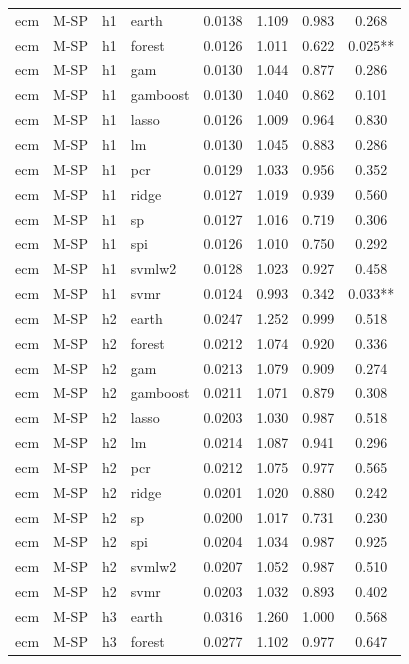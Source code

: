 \begin{ThreePartTable}
\begin{longtable}[t]{llclcccc}
\addlinespace
ecm & M-SP & h1 & earth & 0.0138 & 1.109 & 0.983 & 0.268\\
ecm & M-SP & h1 & forest & 0.0126 & 1.011 & 0.622 & 0.025**\\
ecm & M-SP & h1 & gam & 0.0130 & 1.044 & 0.877 & 0.286\\
ecm & M-SP & h1 & gamboost & 0.0130 & 1.040 & 0.862 & 0.101\\
ecm & M-SP & h1 & lasso & 0.0126 & 1.009 & 0.964 & 0.830\\
ecm & M-SP & h1 & lm & 0.0130 & 1.045 & 0.883 & 0.286\\
ecm & M-SP & h1 & pcr & 0.0129 & 1.033 & 0.956 & 0.352\\
ecm & M-SP & h1 & ridge & 0.0127 & 1.019 & 0.939 & 0.560\\
ecm & M-SP & h1 & sp & 0.0127 & 1.016 & 0.719 & 0.306\\
ecm & M-SP & h1 & spi & 0.0126 & 1.010 & 0.750 & 0.292\\
ecm & M-SP & h1 & svmlw2 & 0.0128 & 1.023 & 0.927 & 0.458\\
ecm & M-SP & h1 & svmr & 0.0124 & 0.993 & 0.342 & 0.033**\\
\addlinespace
ecm & M-SP & h2 & earth & 0.0247 & 1.252 & 0.999 & 0.518\\
ecm & M-SP & h2 & forest & 0.0212 & 1.074 & 0.920 & 0.336\\
ecm & M-SP & h2 & gam & 0.0213 & 1.079 & 0.909 & 0.274\\
ecm & M-SP & h2 & gamboost & 0.0211 & 1.071 & 0.879 & 0.308\\
ecm & M-SP & h2 & lasso & 0.0203 & 1.030 & 0.987 & 0.518\\
ecm & M-SP & h2 & lm & 0.0214 & 1.087 & 0.941 & 0.296\\
ecm & M-SP & h2 & pcr & 0.0212 & 1.075 & 0.977 & 0.565\\
ecm & M-SP & h2 & ridge & 0.0201 & 1.020 & 0.880 & 0.242\\
ecm & M-SP & h2 & sp & 0.0200 & 1.017 & 0.731 & 0.230\\
ecm & M-SP & h2 & spi & 0.0204 & 1.034 & 0.987 & 0.925\\
ecm & M-SP & h2 & svmlw2 & 0.0207 & 1.052 & 0.987 & 0.510\\
ecm & M-SP & h2 & svmr & 0.0203 & 1.032 & 0.893 & 0.402\\
\addlinespace
ecm & M-SP & h3 & earth & 0.0316 & 1.260 & 1.000 & 0.568\\
ecm & M-SP & h3 & forest & 0.0277 & 1.102 & 0.977 & 0.647\\

\end{longtable}
\end{ThreePartTable}
